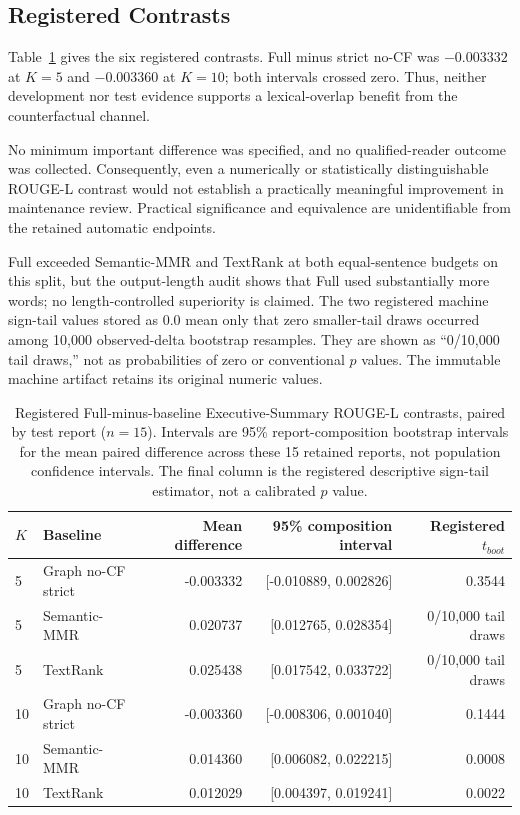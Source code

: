 \documentclass[applsci,article,submit,moreauthors]{Definitions/mdpi}
\begin{document}
\subsection{Registered Contrasts}

Table~\ref{tab:contrasts} gives the six registered contrasts. Full minus strict no-CF was $-0.003332$ at $K=5$ and $-0.003360$ at $K=10$; both intervals crossed zero. Thus, neither development nor test evidence supports a lexical-overlap benefit from the counterfactual channel.

No minimum important difference was specified, and no qualified-reader outcome was collected. Consequently, even a numerically or statistically distinguishable ROUGE-L contrast would not establish a practically meaningful improvement in maintenance review. Practical significance and equivalence are unidentifiable from the retained automatic endpoints.

Full exceeded Semantic-MMR and TextRank at both equal-sentence budgets on this split, but the output-length audit shows that Full used substantially more words; no length-controlled superiority is claimed. The two registered machine sign-tail values stored as 0.0 mean only that zero smaller-tail draws occurred among 10,000 observed-delta bootstrap resamples. They are shown as ``0/10,000 tail draws,'' not as probabilities of zero or conventional $p$ values. The immutable machine artifact retains its original numeric values.

\begin{table}[H]
\caption{Registered Full-minus-baseline Executive-Summary ROUGE-L contrasts, paired by test report ($n=15$). Intervals are 95\% report-composition bootstrap intervals for the mean paired difference across these 15 retained reports, not population confidence intervals. The final column is the registered descriptive sign-tail estimator, not a calibrated $p$ value.}
\label{tab:contrasts}\centering\small
\begin{tabular}{llrrr}
\toprule
$K$ & Baseline & Mean difference & 95\% composition interval & Registered $t_{boot}$\\
\midrule
5 & Graph no-CF strict & -0.003332 & [-0.010889, 0.002826] & 0.3544\\
5 & Semantic-MMR & 0.020737 & [0.012765, 0.028354] & 0/10,000 tail draws\\
5 & TextRank & 0.025438 & [0.017542, 0.033722] & 0/10,000 tail draws\\
10 & Graph no-CF strict & -0.003360 & [-0.008306, 0.001040] & 0.1444\\
10 & Semantic-MMR & 0.014360 & [0.006082, 0.022215] & 0.0008\\
10 & TextRank & 0.012029 & [0.004397, 0.019241] & 0.0022\\
\bottomrule
\end{tabular}
\end{table}
\end{document}
